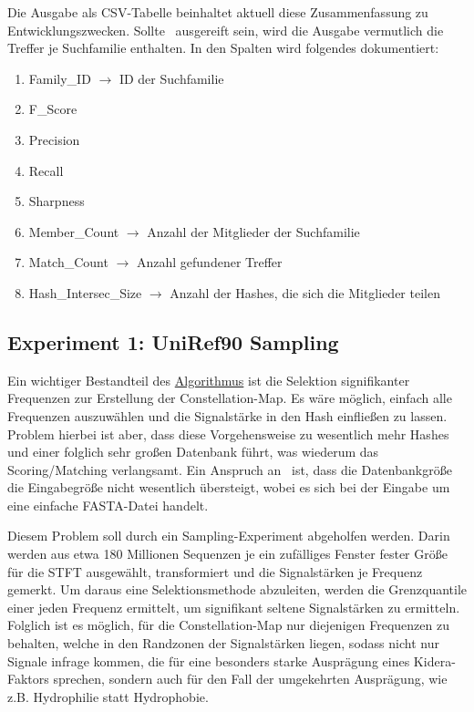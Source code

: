 \begin{enumerate}[a)]
            Die Ausgabe als \ac{CSV}-Tabelle beinhaltet aktuell diese Zusammenfassung zu Entwicklungszwecken. Sollte \protfin\ ausgereift sein, wird die Ausgabe vermutlich die Treffer je Suchfamilie enthalten. In den Spalten wird folgendes dokumentiert:
            \begin{enumerate}[1.]
                \item Family\_ID $\rightarrow$ ID der Suchfamilie
                \item F\_Score
                \item Precision
                \item Recall
                \item Sharpness 
                \item Member\_Count $\rightarrow$ Anzahl der Mitglieder der Suchfamilie
                \item Match\_Count $\rightarrow$ Anzahl gefundener Treffer
                \item Hash\_Intersec\_Size $\rightarrow$ Anzahl der Hashes, die sich die Mitglieder teilen
            \end{enumerate}
        \end{enumerate}

    \subsection{Experiment 1: UniRef90 Sampling} %
        \label{sub:experiment_1_uniref90_sampling}
        Ein wichtiger Bestandteil des \hyperref[sec:grundalgorithmus]{Algorithmus} ist die Selektion signifikanter Frequenzen zur Erstellung der Constellation-Map. Es wäre möglich, einfach alle Frequenzen auszuwählen und die Signalstärke in den Hash einfließen zu lassen. Problem hierbei ist aber, dass diese Vorgehensweise zu wesentlich mehr Hashes und einer folglich sehr großen Datenbank führt, was wiederum das Scoring/Matching verlangsamt. Ein Anspruch an \protfin\ ist, dass die Datenbankgröße die Eingabegröße nicht wesentlich übersteigt, wobei es sich bei der Eingabe um eine einfache FASTA-Datei handelt.

        Diesem Problem soll durch ein Sampling-Experiment abgeholfen werden. Darin werden aus etwa 180 Millionen Sequenzen je ein zufälliges Fenster fester Größe für die \ac{STFT} ausgewählt, transformiert und die Signalstärken je Frequenz gemerkt. Um daraus eine Selektionsmethode abzuleiten, werden die Grenzquantile einer jeden Frequenz ermittelt, um signifikant seltene Signalstärken zu ermitteln. Folglich ist es möglich, für die Constellation-Map nur diejenigen Frequenzen zu behalten, welche in den Randzonen der Signalstärken liegen, sodass nicht nur Signale infrage kommen, die für eine besonders starke Ausprägung eines Kidera-Faktors sprechen, sondern auch für den Fall der umgekehrten Ausprägung, wie z.B. Hydrophilie statt Hydrophobie.

